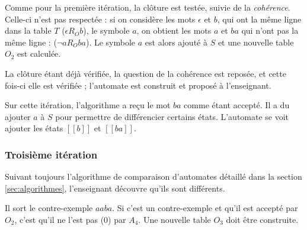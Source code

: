 \vspace{1cm}
Comme pour la première itération, la clôture est testée, suivie de la \emph{cohérence}. Celle-ci n'est pas respectée : si on considère les mots $\epsilon$ et $b$, qui ont la même ligne dans la table $T$ ($\epsilon R_O b$), le symbole $a$, on obtient les mots $a$ et $ba$ qui n'ont pas la même ligne : ($\neg a R_O ba$). Le symbole $a$ est alors ajouté à $S$ et une nouvelle table $O_2$ est calculée.

La clôture étant déjà vérifiée, la question de la cohérence est reposée, et cette fois-ci elle est vérifiée ; l'automate est construit et proposé à l'enseignant.

Sur cette itération, l'algorithme a reçu le mot $ba$ comme étant accepté. Il a du ajouter $a$ à $S$ pour permettre de différencier certains états. L'automate se voit ajouter les états $[[b]]$ et $[[ba]]$.

\subsubsection{Troisième itération}

Suivant toujours l'algorithme de comparaison d'automates détaillé dans la section \ref{sec:algorithmes}, l'enseignant découvre qu'ils sont différents.

Il sort le contre-exemple $aaba$. Si c'est un contre-exemple et qu'il est accepté par $O_2$, c'est qu'il ne l'est pas (0) par $A_4$. Une nouvelle table $O_3$ doit être construite.

